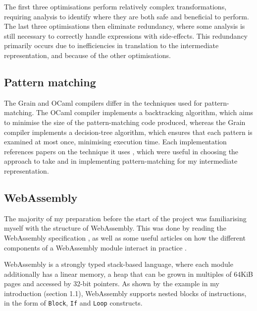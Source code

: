 The first three optimisations perform relatively complex transformations, requiring analysis to identify where they are both safe and beneficial to perform. The last three optimisations then eliminate redundancy, where some analysis is still necessary to correctly handle expressions with side-effects. This redundancy primarily occurs due to inefficiencies in translation to the intermediate representation, and because of the other optimisations.


\subsection{Pattern matching}

The Grain and OCaml compilers differ in the techniques used for pattern-matching.  The OCaml compiler implements a backtracking algorithm, which aims to minimise the size of the pattern-matching code produced, whereas the Grain compiler implements a decision-tree algorithm, which ensures that each pattern is examined at most once, minimising execution time. Each implementation references papers on the technique it uses \cite{ocamlpatternmatch, decisiontrees}, which were useful in choosing the approach to take and in implementing pattern-matching for my intermediate representation.

\subsection{WebAssembly}
The majority of my preparation before the start of the project was familiarising myself with the structure of WebAssembly.
This was done by reading the WebAssembly specification \cite{wasm}, as well as some useful articles on how the different components of a WebAssembly module interact in practice \cite{wasm-article}.

WebAssembly is a strongly typed stack-based language, where each module additionally has a linear memory, a heap that can be grown in multiples of 64KiB pages and accessed by 32-bit pointers. As shown by the example in my introduction (section 1.1), WebAssembly supports nested blocks of instructions, in the form of \verb|Block|, \verb|If| and \verb|Loop| constructs. 

